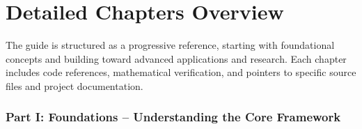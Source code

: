 \documentclass[
]{article}
\begin{document}
\section{Detailed Chapters Overview}\label{detailed-chapters-overview}

The guide is structured as a progressive reference, starting with
foundational concepts and building toward advanced applications and
research. Each chapter includes code references, mathematical
verification, and pointers to specific source files and project
documentation.

\subsubsection{Part I: Foundations -- Understanding the Core
Framework}\label{part-i-foundations-understanding-the-core-framework}
\end{document}
